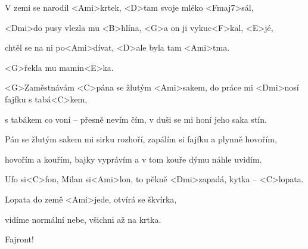 

\zs
V zemi se narodil <Ami>krtek,
<D>tam svoje mléko <Fmaj7>sál,

<Dmi>do pusy vlezla mu <B>hlína,
<G>a on ji vykuc<F>kal, <E>jé,

chtěl se na ni po<Ami>dívat,
<D>ale byla tam <Ami>tma.

<G>řekla mu mamin<E>ka.

\ks
\zs

<G>Zaměstnávám <C>pána se žlutým <Ami>sakem,
do práce mi <Dmi>nosí fajfku s tabá<C>kem,

s tabákem co voní -- přesně nevím čím,
v duši se mi honí jeho saka stín.

Pán se žlutým sakem mi sirku rozhoří,
zapálím si fajfku a plynně hovořím,

hovořím a kouřím, bajky vyprávím
a v tom kouře dýmu náhle uvidím.

\ks
\zs

Ufo si<C>fon, Milan si<Ami>lon,
to pěkně <Dmi>zapadá, kytka -- <C>lopata.

Lopata do země <Ami>jede,
otvírá se škvírka,

vidíme normální nebe,
všichni až na krtka.

Fajront!
\ks

\kp





